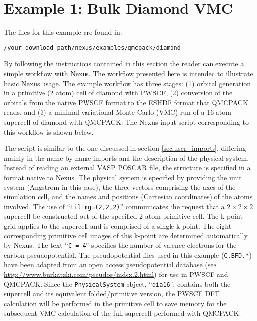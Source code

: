 \documentclass[oneside,11pt]{memoir}
\numberwithin{equation}{section}
\begin{document}
\pagebreak
\section{Example 1: Bulk Diamond VMC}\label{diamond_dmc}
The files for this example are found in:
\begin{shaded}
\begin{verbatim}
/your_download_path/nexus/examples/qmcpack/diamond
\end{verbatim}
\end{shaded}

By following the instructions contained in this section the reader can execute a simple workflow with Nexus.  The workflow presented here is intended to illustrate basic Nexus usage.  The example workflow has three stages: (1) orbital generation in a primitive (2 atom) cell of diamond with PWSCF, (2) conversion of the orbitals from the native PWSCF format to the ESHDF format that QMCPACK reads, and (3) a minimal variational Monte Carlo (VMC) run of a 16 atom supercell of diamond with QMCPACK.  The Nexus input script corresponding to this workflow is shown below.  

The script is similar to the one discussed in section \ref{sec:user_imports}, differing mainly in the name-by-name imports and the description of the physical system.  Instead of reading an external VASP POSCAR file, the structure is specified in a format native to Nexus.  The physical system is specified by providing the unit system (Angstrom in this case), the three vectors comprising the axes of the simulation cell, and the names and positions (Cartesian coordinates) of the atoms involved.  The use of ``\texttt{tiling=(2,2,2)}'' communicates the request that a $2\times2\times2$ supercell be constructed out of the specified 2 atom primitive cell.  The k-point grid applies to the supercell and is comprised of a single k-point.  The eight corresponding primitive cell images of this k-point are determined automatically by Nexus.  The text ``\texttt{C = 4}'' specifies the number of valence electrons for the carbon pseudopotential.  The pseudopotential files used in this example (\texttt{C.BFD.*}) have been adapted from an open access pseudopotential database (see \url{http://www.burkatzki.com/pseudos/index.2.html}) for use in PWSCF and QMCPACK.  Since the \texttt{PhysicalSystem} object, ``\texttt{dia16}'', contains both the supercell and its equivalent folded/primitive version, the PWSCF DFT calculation will be performed in the primitive cell to save memory for the subsequent VMC calculation of the full supercell performed with QMCPACK.
\end{document}
